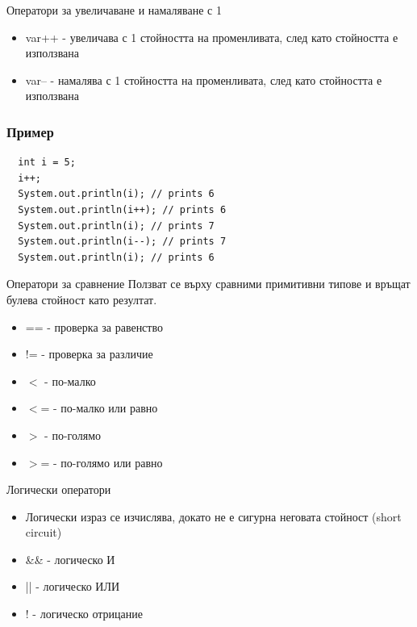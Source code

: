 \documentclass{beamer}
\begin{document}
\begin{frame}{Оператори за увеличаване и намаляване с 1}
  \transdissolve
  \begin{itemize}
  \item var++ - увеличава с 1 стойността на
    променливата, след като стойността е
    използвана
  \item var-- - намалява с 1 стойността на
    променливата, след като стойността е
    използвана
  \end{itemize}
\end{frame}

\begin{frame}[fragile]
  \frametitle{Пример}
  \transdissolve
\begin{lstlisting}
  int i = 5;
  i++;
  System.out.println(i); // prints 6
  System.out.println(i++); // prints 6
  System.out.println(i); // prints 7
  System.out.println(i--); // prints 7
  System.out.println(i); // prints 6
\end{lstlisting}
\end{frame}

\begin{frame}{Оператори за сравнение}
  \transdissolve
  Ползват се върху сравними примитивни
  типове и връщат булева стойност като резултат.
  
  \begin{itemize}
  \item == - проверка за равенство
  \item != - проверка за различие
  \item $<$  - по-малко
  \item $<$= - по-малко или равно
  \item $>$  - по-голямо
  \item $>$= - по-голямо или равно
  \end{itemize}
\end{frame}

\begin{frame}{Логически оператори}
  \transdissolve
  \begin{itemize}
  \item   Логически израз се изчислява, докато
    не е сигурна неговата стойност (short
    circuit)
  \item \&\& - логическо И
  \item || - логическо ИЛИ
  \item ! - логическо отрицание
  \end{itemize}
\end{frame}
\end{document}
